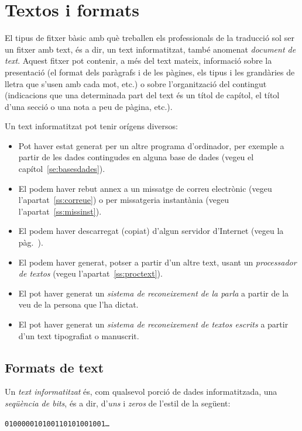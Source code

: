 \chapter{Textos i formats}
\label{se:EPT}

El tipus de fitxer bàsic amb què treballen els professionals de la
traducció sol ser un fitxer amb text, és a dir, un text informatitzat,
també anomenat \emph{document de text}. Aquest fitxer pot contenir, a
més del text mateix, informació sobre la presentació (el format dels
paràgrafs i de les pàgines, els tipus i les grandàries de lletra que
s'usen amb cada mot, etc.) o sobre l'organització del contingut
(indicacions  que una determinada part del text és un títol de
capítol, el títol d'una secció o una nota a peu de pàgina, etc.).

Un text informatitzat pot tenir orígens diversos:
\begin{itemize}
\item Pot haver estat generat per un altre programa d'ordinador, per
  exemple a partir de les dades contingudes en alguna base de dades
  (vegeu el capítol~\ref{se:basesdades}).
\item El podem haver rebut annex a un missatge de correu electrònic
  (vegeu l'apartat~\ref{ss:correue}) o per missatgeria instantània
  (vegeu l'apartat~\ref{ss:missinst}).
\item El podem haver descarregat (copiat) d'algun servidor d'Internet
  (vegeu la pàg.~\pageref{pg:ftp}).
\item El podem haver generat, potser a partir d'un altre
  text, usant un \emph{processador de textos} (vegeu
  l'apartat~\ref{ss:proctext}).
\item El pot haver generat un \emph{sistema de reconeixement de la
    parla} a partir de la veu de la persona que l'ha dictat.
\item El pot haver generat un \emph{sistema de reconeixement de textos
    escrits} a partir d'un text tipografiat o manuscrit.
\end{itemize}

\section{Formats de text} \label{ss:formats}
Un \emph{text informatitzat} és, com qualsevol porció de dades
informatitzada, una \emph{seqüència de bits}, és a dir, d'\emph{uns} i
\emph{zeros} de l'estil de la següent:
\begin{center}
 \texttt{010000010100110101001001\ldots}
\end{center}

